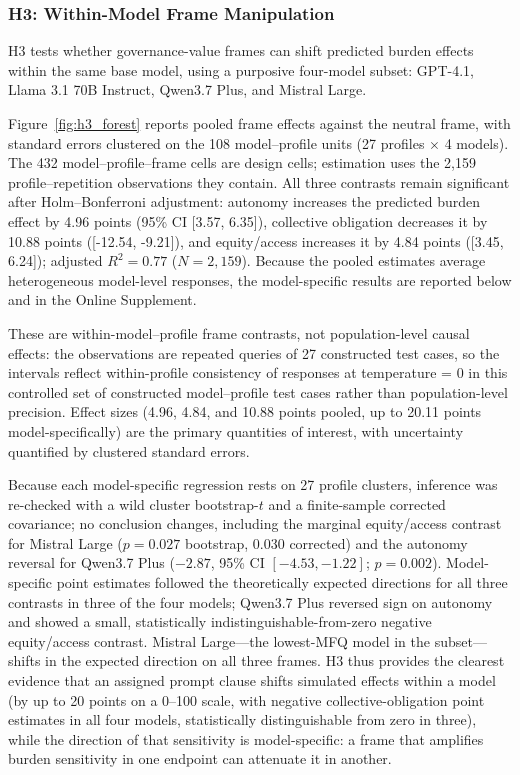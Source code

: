 \documentclass[12pt,a4paper]{article}
\begin{document}
\subsubsection{H3: Within-Model Frame Manipulation}
\label{subsubsec:results-h3}

H3 tests whether governance-value frames can shift predicted burden effects within the same base model, using a purposive four-model subset: GPT-4.1, Llama 3.1 70B Instruct, Qwen3.7 Plus, and Mistral Large.

Figure~\ref{fig:h3_forest} reports pooled frame effects against the neutral frame, with standard errors clustered on the 108 model--profile units (27 profiles $\times$ 4 models). The 432 model--profile--frame cells are design cells; estimation uses the 2{,}159 profile--repetition observations they contain. All three contrasts remain significant after Holm--Bonferroni adjustment: autonomy increases the predicted burden effect by 4.96 points (95\% CI [3.57, 6.35]), collective obligation decreases it by 10.88 points ([-12.54, -9.21]), and equity/access increases it by 4.84 points ([3.45, 6.24]); adjusted $R^2 = 0.77$ ($N = 2{,}159$). Because the pooled estimates average heterogeneous model-level responses, the model-specific results are reported below and in the Online Supplement.

These are within-model--profile frame contrasts, not population-level causal effects: the observations are repeated queries of 27 constructed test cases, so the intervals reflect within-profile consistency of responses at temperature = 0 in this controlled set of constructed model--profile test cases rather than population-level precision. Effect sizes (4.96, 4.84, and 10.88 points pooled, up to 20.11 points model-specifically) are the primary quantities of interest, with uncertainty quantified by clustered standard errors.

Because each model-specific regression rests on 27 profile clusters, inference was re-checked with a wild cluster bootstrap-$t$ and a finite-sample corrected covariance; no conclusion changes, including the marginal equity/access contrast for Mistral Large ($p=0.027$ bootstrap, $0.030$ corrected) and the autonomy reversal for Qwen3.7 Plus ($-2.87$, 95\% CI $[-4.53, -1.22]$; $p=0.002$). Model-specific point estimates followed the theoretically expected directions for all three contrasts in three of the four models; Qwen3.7 Plus reversed sign on autonomy and showed a small, statistically indistinguishable-from-zero negative equity/access contrast. Mistral Large---the lowest-MFQ model in the subset---shifts in the expected direction on all three frames. H3 thus provides the clearest evidence that an assigned prompt clause shifts simulated effects within a model (by up to 20 points on a 0--100 scale, with negative collective-obligation point estimates in all four models, statistically distinguishable from zero in three), while the direction of that sensitivity is model-specific: a frame that amplifies burden sensitivity in one endpoint can attenuate it in another.
\end{document}
